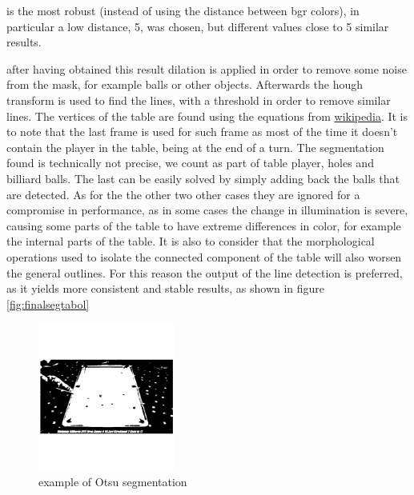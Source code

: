 is the most robust (instead of using the distance between bgr colors), in particular a low distance, 5, was chosen, but different values close to 5 similar results.\par
after having obtained this result dilation is applied in order to remove some noise from the mask,
for example balls or other objects. Afterwards the hough transform is used to find the lines, 
with a threshold in order to remove similar lines.
The vertices of the table are found using the equations from \href{https://en.wikipedia.org/wiki/Line\%E2\%80\%93line\_intersection}{wikipedia}.
It is to note that the last frame is used for such frame as most of the time it doesn't contain the player in the table, being at the end of
a turn.
The segmentation found is technically not precise, we count as part of table player, holes and billiard balls. The last can be easily solved by simply adding back the balls that are detected. 
As for the the other two other cases they are ignored for a compromise in performance, as in some
cases the change in illumination is severe, causing some parts of the table to have extreme 
differences in color, for example the internal parts of the table. It is also to consider that the morphological operations used to isolate the connected component of the table will also worsen
the general outlines. For this reason the output of the line detection is preferred, as it yields
more consistent and stable results, as shown in figure \ref{fig:finalsegtabol}

\begin{figure}[h]
    \centering
    \includegraphics[width=0.4\textwidth]{./imgs/otsu_table.png}
    \caption{example of Otsu segmentation}
\end{figure}


